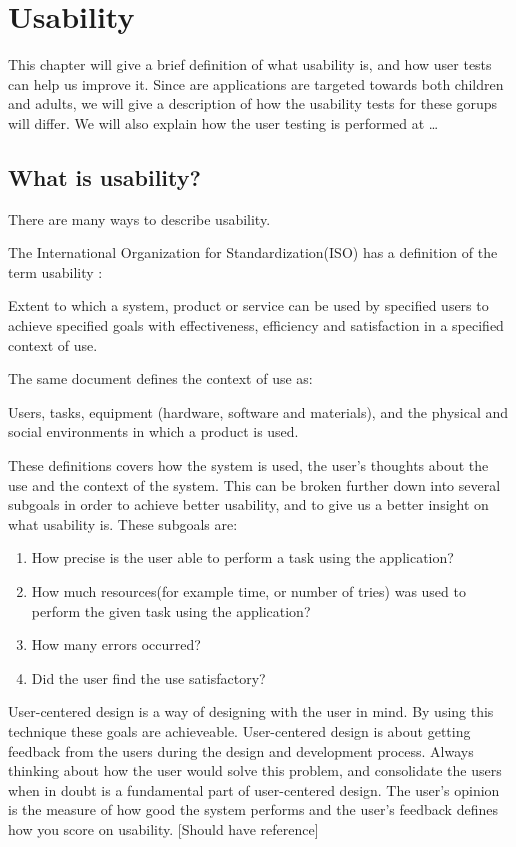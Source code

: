 \chapter{Usability}
\label{chp:usability}

This chapter will give a brief definition of what usability is, and how user tests can help us improve it. Since are applications are targeted towards both children and adults, we will give a description of how the usability tests for these gorups will differ. We will also explain how the user testing is performed at \ldots

\section{What is usability?}
There are many ways to describe usability. 

The International Organization for Standardization(ISO) has a definition of the term usability \cite{isousability}:

Extent to which a system, product or service can be used by specified
users to achieve specified goals with effectiveness, efficiency
and satisfaction in a specified context of use.

The same document defines the context of use as:

Users, tasks, equipment (hardware, software and materials), and
the physical and social environments in which a product is used.

These definitions covers how the system is used, the user's thoughts about the use and the context of the system. This can be broken further down into several subgoals in order to achieve better usability, and to give us a better insight on what usability is. 
These subgoals are:

\begin{enumerate}
\item{How precise is the user able to perform a task using the application?}
\item{How much resources(for example time, or number of tries) was used to perform the given task using the application?}
\item{How many errors occurred?}
\item{Did the user find the use satisfactory?}
\end{enumerate}

User-centered design is a way of designing with the user in mind. By using this technique these goals are achieveable. User-centered design is about getting feedback from the users during the design and development process. Always thinking about how the user would solve this problem, and consolidate the users when in doubt is a fundamental part of user-centered design. The user's opinion is the measure of how good the system performs and the user's feedback defines how you score on usability. [Should have reference]

